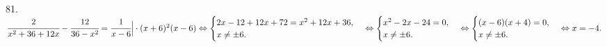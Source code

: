 81. $\cfrac{2}{x^2+36+12x}-\cfrac{12}{36-x^2}=\cfrac{1}{x-6}\Big|\cdot(x+6)^2(x-6)\Leftrightarrow
\begin{cases}2x-12+12x+72=x^2+12x+36,\\ x\neq\pm6.\end{cases}\Leftrightarrow
\begin{cases}x^2-2x-24=0,\\ x\neq\pm6.\end{cases}\Leftrightarrow
\begin{cases}(x-6)(x+4)=0,\\ x\neq\pm6.\end{cases}\Leftrightarrow x=-4.$\\
